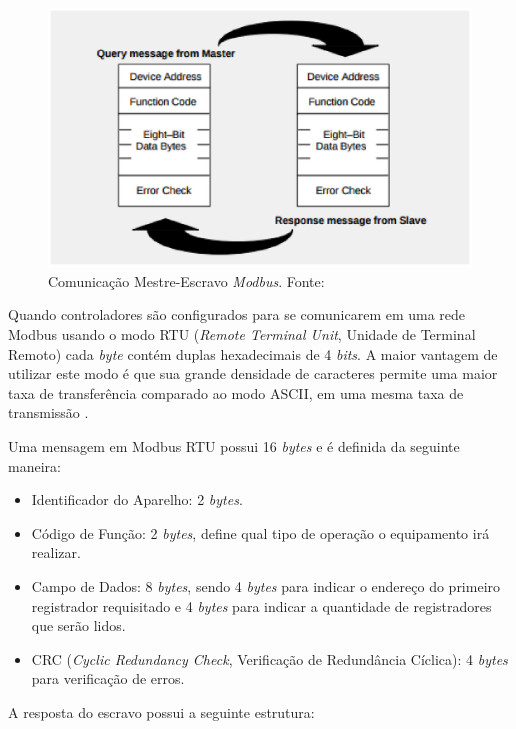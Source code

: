     \begin{figure}[!htpb]
        \centering
        \includegraphics[keepaspectratio=true,scale=0.8]{figuras/mestre_escravo.eps}
        \caption{Comunicação Mestre-Escravo \textit{Modbus}. Fonte: \cite{modbus}}
        \label{mestre_escravo}
    \end{figure}

    Quando controladores são configurados para se comunicarem em uma rede Modbus usando o modo RTU (\textit{Remote Terminal Unit}, Unidade de Terminal Remoto) cada \textit{byte} contém duplas hexadecimais de 4 \textit{bits}. A maior vantagem de utilizar este modo é que sua grande densidade de caracteres permite uma maior taxa de transferência comparado ao modo ASCII, em uma mesma taxa de transmissão \cite{modbus}.

    Uma mensagem em Modbus RTU possui 16 \textit{bytes} e é definida da seguinte maneira:
    \begin{itemize}
        \item Identificador do Aparelho: 2 \textit{bytes}.
        \item Código de Função: 2 \textit{bytes}, define qual tipo de operação o equipamento irá realizar.
        \item Campo de Dados: 8 \textit{bytes}, sendo 4 \textit{bytes} para indicar o endereço do primeiro registrador requisitado e 4 \textit{bytes} para indicar a quantidade de registradores que serão lidos.
        \item CRC (\textit{Cyclic Redundancy Check}, Verificação de Redundância Cíclica): 4 \textit{bytes} para verificação de erros.
    \end{itemize}

    A resposta do escravo possui a seguinte estrutura:

